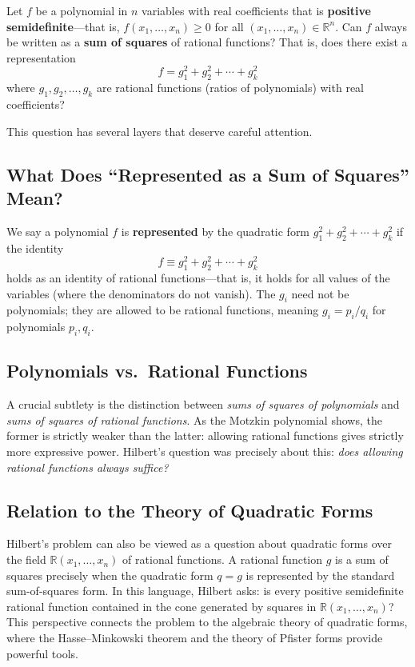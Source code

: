 \begin{problem_statement}
Let $f$ be a polynomial in $n$ variables with real coefficients that is \textbf{positive semidefinite}---that is, $f(x_1, \ldots, x_n) \geq 0$ for all $(x_1, \ldots, x_n) \in \mathbb{R}^n$. Can $f$ always be written as a \textbf{sum of squares} of rational functions? That is, does there exist a representation
\[
    f = g_1^2 + g_2^2 + \cdots + g_k^2
\]
where $g_1, g_2, \ldots, g_k$ are rational functions (ratios of polynomials) with real coefficients?
\end{problem_statement}

This question has several layers that deserve careful attention.

\subsection{What Does ``Represented as a Sum of Squares'' Mean?}

We say a polynomial $f$ is \textbf{represented} by the quadratic form $g_1^2 + g_2^2 + \cdots + g_k^2$ if the identity
\[
    f \equiv g_1^2 + g_2^2 + \cdots + g_k^2
\]
holds as an identity of rational functions---that is, it holds for all values of the variables (where the denominators do not vanish). The $g_i$ need not be polynomials; they are allowed to be rational functions, meaning $g_i = p_i/q_i$ for polynomials $p_i, q_i$.

\subsection{Polynomials vs.\ Rational Functions}

A crucial subtlety is the distinction between \emph{sums of squares of polynomials} and \emph{sums of squares of rational functions}. As the Motzkin polynomial shows, the former is strictly weaker than the latter: allowing rational functions gives strictly more expressive power. Hilbert's question was precisely about this: \emph{does allowing rational functions always suffice?}

\subsection{Relation to the Theory of Quadratic Forms}

Hilbert's problem can also be viewed as a question about quadratic forms over the field $\mathbb{R}(x_1,\ldots,x_n)$ of rational functions. A rational function $g$ is a sum of squares precisely when the quadratic form $q = g$ is represented by the standard sum-of-squares form. In this language, Hilbert asks: is every positive semidefinite rational function contained in the cone generated by squares in $\mathbb{R}(x_1,\ldots,x_n)$? This perspective connects the problem to the algebraic theory of quadratic forms, where the Hasse--Minkowski theorem and the theory of Pfister forms provide powerful tools.

